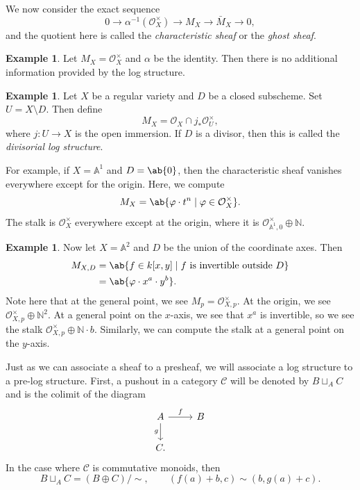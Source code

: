 \documentclass{amsart}
\theoremstyle{definition}
\newtheorem{exm}[thm]{Example}
\theoremstyle{remark}
\theoremstyle{plain}
\theoremstyle{definition}
\theoremstyle{remark}
\newcommand{\A}{\mathbb{A}}
\newcommand{\N}{\mathbb{N}}
\newcommand{\mc}[1]{\mathcal{#1}}
\newcommand{\1}{\mathbf{1}}
\newcommand{\2}{\mathbf{2}}
\newcommand{\3}{\mathbf{3}}
\begin{document}
We now consider the exact sequence
\[ 0 \to \alpha^{-1}(\mc{O}_X^{\times}) \to M_X \to \bar{M}_X \to 0, \]
and the quotient here is called the \textit{characteristic sheaf} or the \textit{ghost sheaf}.

\begin{exm}
    Let \(M_X = \mc{O}_X^{\times}\)  and \(\alpha\) be the identity. Then there is no additional information provided by the log structure.
\end{exm}

\begin{exm}
    Let \(X\) be a regular variety and \(D\) be a closed subscheme. Set \(U = X \setminus D\). Then define
    \[ M_X = \mc{O}_X \cap j_* \mc{O}_U^{\times}, \]
    where \(j \colon U \to X\) is the open immersion. If \(D\) is a divisor, then this is called the \textit{divisorial log structure}.

    For example, if \(X = \A^1\) and \(D = \ab\{0\}\), then the characteristic sheaf vanishes everywhere except for the origin. Here, we compute
    \[ M_X = \ab\{ \varphi \cdot t^n \mid \varphi \in \mc{O}_X^{\times} \}. \]
    The stalk is \(\mc{O}_X^{\times}\) everywhere except at the origin, where it is \(\mc{O}_{\A^1, 0}^{\times} \oplus \N\).
\end{exm}

\begin{exm}
    Now let \(X = \A^2\) and \(D\) be the union of the coordinate axes. Then
    \begin{align*}
        M_{X,D} &= \ab\{f \in k[x,y] \mid f \text{ is invertible outside } D \} \\
        &= \ab\{\varphi \cdot x^a \cdot y^b\}.
    \end{align*}
    Note here that at the general point, we see \(M_p = \mc{O}_{X,p}^{\times}\). At the origin, we see \(\mc{O}_{X,p}^{\times}\oplus \N^2\). At a general point on the \(x\)-axis, we see that \(x^a\) is invertible, so we see the stalk \(\mc{O}_{X,p}^{\times}\oplus \N \cdot b\). Similarly, we can compute the stalk at a general point on the \(y\)-axis.   
\end{exm}

Just as we can associate a sheaf to a presheaf, we will associate a log structure to a pre-log structure. First, a pushout in a category \(\mc{C}\) will be denoted by \(B \sqcup_A C\) and is the colimit of the diagram
\begin{equation*}
\begin{tikzcd}
    A \ar{r}{f} \ar{d}[swap]{g} & B \\
    C.
\end{tikzcd}
\end{equation*}
In the case where \(\mc{C}\) is commutative monoids, then
\[ B \sqcup_A C = (B \oplus C)/\sim, \qquad (f(a) + b, c) \sim (b, g(a)+c). \]
\end{document}
